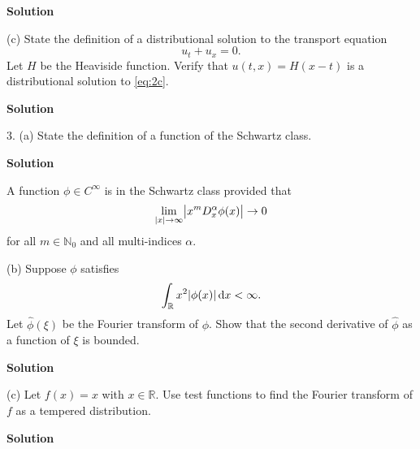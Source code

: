 \documentclass{article}
\begin{document}
\textbf{Solution}

\vspace{5mm}

(c) State the definition of a distributional solution to the transport
equation
%
\begin{equation}
    u_t + u_x = 0
    .
    \label{eq:2c}
\end{equation}
%
Let $H$ be the Heaviside function. Verify that $u(t, x) = H(x - t)$ is a
distributional solution to \eqref{eq:2c}.

\textbf{Solution}

\newpage

3. (a) State the definition of a function of the Schwartz class.

\textbf{Solution}

A function $\phi \in C^\infty$ is in the Schwartz class provided that
%
\begin{equation*}
    \lim_{|x| \to \infty} \envert{x^m D_x^\alpha \phi(x)} \to 0
\end{equation*}
%
for all $m \in \mathbb{N}_0$ and all multi-indices $\alpha$.

\vspace{5mm}

(b) Suppose $\phi$ satisfies
%
\begin{equation*}
    \int_{\mathbb{R}} x^2 |\phi(x)| \dif x < \infty
    .
\end{equation*}
%
Let $\widehat{\phi}(\xi)$ be the Fourier transform of $\phi$. Show that
the second derivative of $\widehat{\phi}$ as a function of $\xi$ is
bounded.

\textbf{Solution}

\vspace{5mm}

(c) Let $f(x) = x$ with $x \in \mathbb{R}$. Use test functions to find
the Fourier transform of $f$ as a tempered distribution.

\textbf{Solution}
\end{document}
